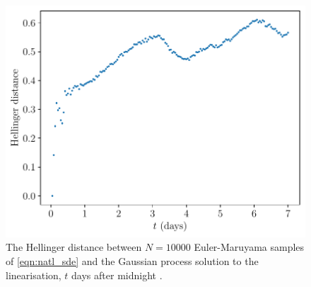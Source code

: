 


\begin{figure}
	\begin{center}
		\includegraphics[width=\textwidth]{chp06_applications/figures/gulf_stream/traj_stoch_hell_dist.pdf}
		\caption{The Hellinger distance between \(N = 10000\) Euler-Maruyama samples of \cref{eqn:natl_sde} and the Gaussian process solution to the linearisation, \(t\) days after midnight .}
		\label{fig:}
	\end{center}
\end{figure}





